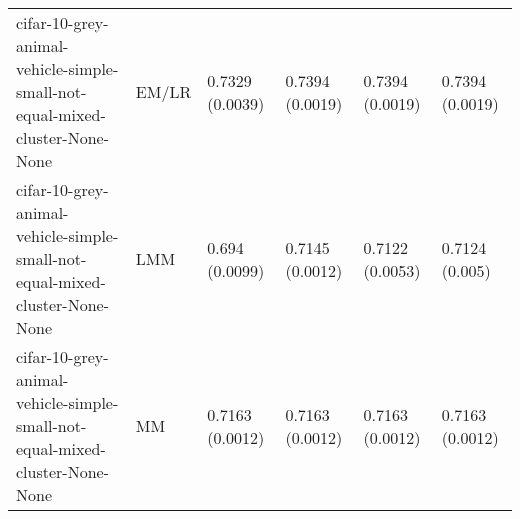 \begin{longtable}{llllll}
            cifar-10-grey-animal-vehicle-simple-small-not-equal-mixed-cluster-None-None &     EM/LR & 0.7329 (0.0039) &  0.7394 (0.0019) &   0.7394 (0.0019) &     0.7394 (0.0019) \\
            cifar-10-grey-animal-vehicle-simple-small-not-equal-mixed-cluster-None-None &       LMM &  0.694 (0.0099) &  0.7145 (0.0012) &   0.7122 (0.0053) &      0.7124 (0.005) \\
            cifar-10-grey-animal-vehicle-simple-small-not-equal-mixed-cluster-None-None &        MM & 0.7163 (0.0012) &  0.7163 (0.0012) &   0.7163 (0.0012) &     0.7163 (0.0012) \\
\end{longtable}
